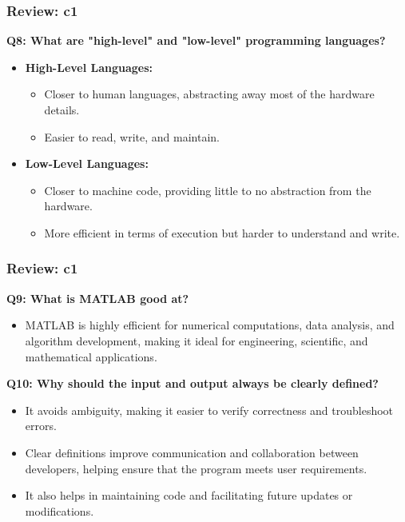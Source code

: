 \documentclass[
	11pt, %
]{beamer}
\begin{document}


\begin{frame}
	\frametitle{Review: c1}

	\textbf{Q8: What are "high-level" and "low-level" programming languages?}

	\begin{itemize}
	    \item \textbf{High-Level Languages:}
	    \begin{itemize}
	        \item Closer to human languages, abstracting away most of the hardware details.
	        \item Easier to read, write, and maintain.
	    \end{itemize}
	    
	    \item \textbf{Low-Level Languages:}
	    \begin{itemize}
	        \item Closer to machine code, providing little to no abstraction from the hardware.
	        \item More efficient in terms of execution but harder to understand and write.
	    \end{itemize}
	\end{itemize}

\end{frame}


\begin{frame}
	\frametitle{Review: c1}

\textbf{Q9: What is MATLAB good at?}

	\begin{itemize}
	    \item MATLAB is highly efficient for numerical computations, data analysis, and algorithm development, making it ideal for engineering, scientific, and mathematical applications.
	\end{itemize}

	\vspace{0.5cm}

	\textbf{Q10: Why should the input and output always be clearly defined?}

	\begin{itemize}
	    \item It avoids ambiguity, making it easier to verify correctness and troubleshoot errors.
	    \item Clear definitions improve communication and collaboration between developers, helping ensure that the program meets user requirements.
	    \item It also helps in maintaining code and facilitating future updates or modifications.
	\end{itemize}
	

\end{frame}
\end{document}

